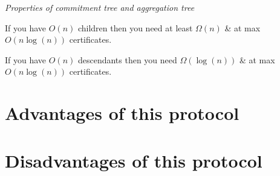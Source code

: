 \textit{Properties of commitment tree and aggregation tree}

	If you have $O(n)$ children then you need at least $\Omega(n)$ \& at max $O(n\log(n))$ certificates.

	If you have $O(n)$ descendants then you need $\Omega(\log(n))$  \& at max $O(n\log(n))$ certificates.


\section{Advantages of this protocol}
\section{Disadvantages of this protocol}